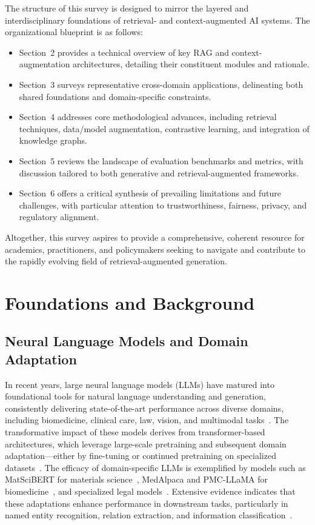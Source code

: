 \documentclass[sigconf]{acmart}
\begin{document}
The structure of this survey is designed to mirror the layered and interdisciplinary foundations of retrieval- and context-augmented AI systems. The organizational blueprint is as follows:
\begin{itemize}
    \item Section~2 provides a technical overview of key RAG and context-augmentation architectures, detailing their constituent modules and rationale.
    \item Section~3 surveys representative cross-domain applications, delineating both shared foundations and domain-specific constraints.
    \item Section~4 addresses core methodological advances, including retrieval techniques, data/model augmentation, contrastive learning, and integration of knowledge graphs.
    \item Section~5 reviews the landscape of evaluation benchmarks and metrics, with discussion tailored to both generative and retrieval-augmented frameworks.
    \item Section~6 offers a critical synthesis of prevailing limitations and future challenges, with particular attention to trustworthiness, fairness, privacy, and regulatory alignment.
\end{itemize}
Altogether, this survey aspires to provide a comprehensive, coherent resource for academics, practitioners, and policymakers seeking to navigate and contribute to the rapidly evolving field of retrieval-augmented generation.

\section{Foundations and Background}

\subsection{Neural Language Models and Domain Adaptation}

In recent years, large neural language models (LLMs) have matured into foundational tools for natural language understanding and generation, consistently delivering state-of-the-art performance across diverse domains, including biomedicine, clinical care, law, vision, and multimodal tasks~\cite{ref1,ref2,ref3,ref6,ref7,ref8,ref29,ref31,ref42,ref48,ref52,ref63}. The transformative impact of these models derives from transformer-based architectures, which leverage large-scale pretraining and subsequent domain adaptation—either by fine-tuning or continued pretraining on specialized datasets~\cite{ref6,ref31,ref63}. The efficacy of domain-specific LLMs is exemplified by models such as MatSciBERT for materials science~\cite{ref29}, MedAlpaca and PMC-LLaMA for biomedicine~\cite{ref3,ref31,ref48}, and specialized legal models~\cite{ref8}. Extensive evidence indicates that these adaptations enhance performance in downstream tasks, particularly in named entity recognition, relation extraction, and information classification~\cite{ref3,ref29,ref31,ref42,ref48}.
\end{document}

